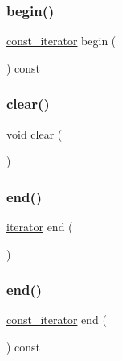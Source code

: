 \subsubsection{\texorpdfstring{begin()}{begin()}\hspace{0.1cm}{\footnotesize\ttfamily [2/2]}}
{\footnotesize\ttfamily \mbox{\hyperlink{classGrid_a85b414fe7dab929481b0e9d4cbc8eaed}{const\+\_\+iterator}} begin (\begin{DoxyParamCaption}{ }\end{DoxyParamCaption}) const\hspace{0.3cm}{\ttfamily [inline]}}

\mbox{\label{classGrid_ac8bb3912a3ce86b15842e79d0b421204}} 
\subsubsection{\texorpdfstring{clear()}{clear()}}
{\footnotesize\ttfamily void clear (\begin{DoxyParamCaption}{ }\end{DoxyParamCaption})}

\mbox{\label{classGrid_acad38d52497a975bfb6f2f6acd76631f}} 
\subsubsection{\texorpdfstring{end()}{end()}\hspace{0.1cm}{\footnotesize\ttfamily [1/2]}}
{\footnotesize\ttfamily \mbox{\hyperlink{classGrid_afc815b8f7acde11a959911c7f7222116}{iterator}} end (\begin{DoxyParamCaption}{ }\end{DoxyParamCaption})\hspace{0.3cm}{\ttfamily [inline]}}

\mbox{\label{classGrid_accf9a4bd0c34d4a5f6a7dab66ea10cdc}} 
\subsubsection{\texorpdfstring{end()}{end()}\hspace{0.1cm}{\footnotesize\ttfamily [2/2]}}
{\footnotesize\ttfamily \mbox{\hyperlink{classGrid_a85b414fe7dab929481b0e9d4cbc8eaed}{const\+\_\+iterator}} end (\begin{DoxyParamCaption}{ }\end{DoxyParamCaption}) const\hspace{0.3cm}{\ttfamily [inline]}}

